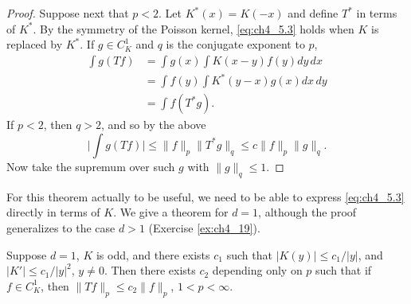 \begin{proof}
Suppose next that $p < 2$. Let $K^*(x) = K(-x)$ and define $T^*$ in terms of $K^*$. By the symmetry of the Poisson kernel, \eqref{eq:ch4_5.3} holds when $K$ is replaced by $K^*$. If $g \in C_K^1$ and $q$ is the conjugate exponent to $p$,
\begin{align*}
    \int g(Tf) &= \int g(x) \int K(x-y)f(y)dy\,dx \\
    &= \int f(y) \int K^*(y-x)g(x)dx\,dy \\
    &= \int f(T^*g).
\end{align*}
If $p < 2$, then $q > 2$, and so by the above
\[
    \Big|\int g(Tf)\Big| \leq \|f\|_p\|T^*g\|_q \leq c\|f\|_p\|g\|_q.
\]
Now take the supremum over such $g$ with $\|g\|_q \leq 1$.
\end{proof}

For this theorem actually to be useful, we need to be able to express \eqref{eq:ch4_5.3} directly in terms of $K$. We give a theorem for $d=1$, although the proof generalizes to the case $d > 1$ (Exercise \ref{ex:ch4_19}).

\begin{theorem}\label{thm:ch4_5.3}
Suppose $d=1$, $K$ is odd, and there exists $c_1$ such that $|K(y)| \leq c_1/|y|$, and $|K'| \leq c_1/|y|^2$, $y \neq 0$. Then there exists $c_2$ depending only on $p$ such that if $f \in C_K^1$, then $\|Tf\|_p \leq c_2\|f\|_p$, $1 < p < \infty$.
\end{theorem}


